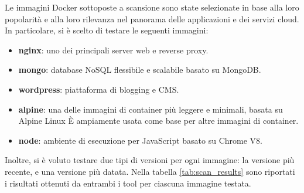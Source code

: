 Le immagini Docker sottoposte a scansione sono state selezionate in base alla loro popolarità e alla loro rilevanza nel panorama delle applicazioni e dei servizi cloud. In particolare, si è scelto di testare le seguenti immagini:
\begin{itemize}
   \item\textbf{nginx}: uno dei principali server web e reverse proxy.
   \item\textbf{mongo}: database NoSQL flessibile e scalabile basato su MongoDB.
   \item\textbf{wordpress}: piattaforma di blogging e CMS.
   \item\textbf{alpine}: una delle immagini di container più leggere e minimali, basata su Alpine Linux È ampiamente usata come base per altre immagini di container.
   \item\textbf{node}: ambiente di esecuzione per JavaScript basato su Chrome V8.
\end{itemize}
Inoltre, si è voluto testare due tipi di versioni per ogni immagine: la versione più recente, e una versione più datata.
Nella tabella \ref{tab:scan_results} sono riportati i risultati ottenuti da entrambi i tool per ciascuna immagine testata.
